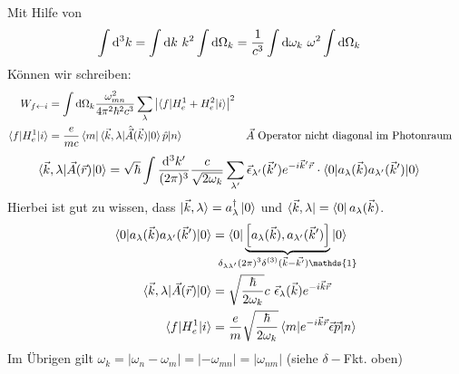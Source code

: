 		Mit Hilfe von
		\begin{align*}
		\int \mathrm{d}^3 k &= \int \mathrm{d} k ~k^2 \int \mathrm{d} \Omega_k
		= \frac{1}{c^3} \int \mathrm{d} \omega_k ~\omega^2 \int \mathrm{d} \Omega_k
		\end{align*}
		Können wir schreiben:
		\begin{align*}
		W_{f \leftarrow i} &= \int \mathrm{d} \Omega_k 
		\frac{\omega_{mn}^2}{4 \pi^2 \hbar^2 c^3}
		\sum_\lambda 
		\left|\braket{f | H_e^1 + H_e^2 | i}\right|^2 \\
		\braket{f | H_e^1 | i} &= 
		\frac{e}{mc} \braket{m | \braket{\vec{k} , \lambda | \hat{\vec{A}}(\vec{k}) | 0} \hat{p} | n} & &\vec{A}\text{~Operator nicht diagonal im Photonraum}
		\end{align*}
		\begin{align*}
		\braket{\vec{k} ,\lambda | \vec{A} (\vec{r}) | 0} &= 
		\sqrt{\hbar} \int \frac{\mathrm{d}^3 k'}{(2 \pi)^3} \frac{c}{\sqrt{2 \omega_k}}
		\sum_{\lambda'} \vec{\epsilon}_{\lambda'} (\vec{k}') e^{-i \vec{k}' \vec{r}} 
		\cdot \braket{0 | a_\lambda (\vec{k}) a_{\lambda'} (\vec{k}') | 0} 
		\end{align*} 
		Hierbei ist gut zu wissen, dass $\ket{\vec{k} , \lambda} = a_\lambda^\dagger \ket{0}$ und $\bra{\vec{k}, \lambda} = \bra{0}a_\lambda (\vec{k})$.
		\begin{align*}
		\braket{0 | a_\lambda (\vec{k}) a_{\lambda'} (\vec{k}') | 0} &=
		\braket{0 | 
			\underbrace{\left[ a_\lambda (\vec{k}), a_{\lambda'} (\vec{k}') \right]}_{\mathclap{\delta_{\lambda \lambda'} (2 \pi)^3 \delta^{(3)}(\vec{k} - \vec{k'}) \mathds{1}}}  
			| 0} \\
		\braket{\vec{k}, \lambda | \vec{A} (\vec{r}) | 0} &=
		\sqrt{\frac{\hbar}{2 \omega_k}} c~ \vec{\epsilon}_\lambda (\vec{k}) e^{-i \vec{k} \vec{r}} \\
		\braket{f | H_e^1 | i} &= 
		\frac{e}{m} \sqrt{\frac{\hbar}{2 \omega_k}}
		\braket{m | e^{-i \vec{k} \vec{r}} \vec{\epsilon} \vec{p} | n} 
		\end{align*}
		Im Übrigen gilt $\omega_k = |\omega_n - \omega_m| = |-\omega_{mn}| = |\omega_{nm}|$ (siehe $\delta-$Fkt. oben)
		
